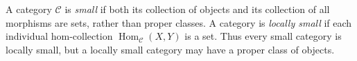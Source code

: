 
A category $\mathcal C$ is \emph{small} if both its collection of objects and its collection of all morphisms are sets, rather than proper classes. A category is \emph{locally small} if each individual hom-collection $\operatorname{Hom}_{\mathcal C}(X,Y)$ is a set. Thus every small category is locally small, but a locally small category may have a proper class of objects.
